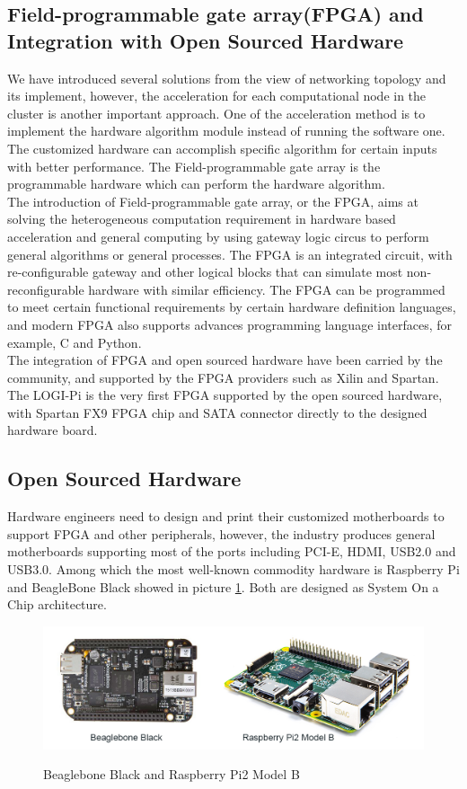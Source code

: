 \documentclass[11pt,openright,a4paper]{report}
\begin{document}
\subsection{Field-programmable gate array(FPGA) and Integration with Open Sourced Hardware}
We have introduced several solutions from the view of networking topology and its implement, however, the acceleration for each computational node in the cluster is another important approach. One of the acceleration method is to implement the hardware algorithm module instead of running the software one. The customized hardware can accomplish specific algorithm for certain inputs with better performance. The Field-programmable gate array is the programmable hardware which can perform the hardware algorithm.\\
The introduction of Field-programmable gate array, or the FPGA, aims at solving the heterogeneous computation requirement in hardware based acceleration and general computing by using gateway logic circus to perform general algorithms or general processes\cite{hauck2010reconfigurable}. The FPGA is an integrated circuit, with re-configurable gateway and other logical blocks that can simulate most non-reconfigurable hardware with similar efficiency. The FPGA can be programmed to meet certain functional requirements by certain hardware definition languages, and modern FPGA also supports advances programming language interfaces, for example, C and Python.\\
The integration of FPGA and open sourced hardware have been carried by the community, and supported by the FPGA providers such as Xilin and Spartan. The LOGI-Pi is the very first FPGA supported by the open sourced hardware, with Spartan FX9 FPGA chip and SATA connector directly to the designed hardware board\cite{logipi}.
\subsection{Open Sourced Hardware}
Hardware engineers need to design and print their customized motherboards to support FPGA and other peripherals, however, the industry produces general motherboards supporting most of the ports including PCI-E, HDMI, USB2.0 and USB3.0. Among which the most well-known commodity hardware is Raspberry Pi and BeagleBone Black showed in picture \ref{fig:commodityhardware}. Both are designed as System On a Chip architecture.\\ 
\begin{figure}[H]
	\centering
	\includegraphics[width=0.7\linewidth]{picture/commodityhardware.jpg}
	\caption{Beaglebone Black and Raspberry Pi2 Model B}\cite{bbbrpi}
	\label{fig:commodityhardware}
\end{figure}
\end{document}
